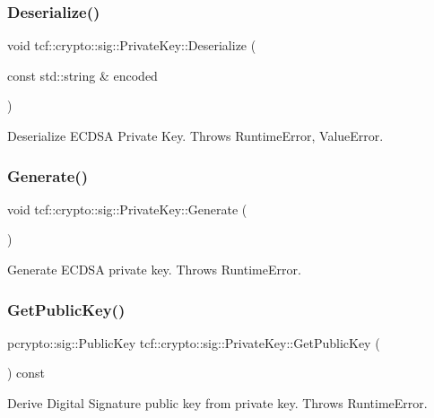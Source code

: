 \subsubsection{\texorpdfstring{Deserialize()}{Deserialize()}}
{\footnotesize\ttfamily void tcf\+::crypto\+::sig\+::\+Private\+Key\+::\+Deserialize (\begin{DoxyParamCaption}\item[{const std\+::string \&}]{encoded }\end{DoxyParamCaption})}

Deserialize E\+C\+D\+SA Private Key. Throws Runtime\+Error, Value\+Error. \mbox{\label{classtcf_1_1crypto_1_1sig_1_1PrivateKey_a869f91662055e93ea7cc5ed6d3c21423}} 
\subsubsection{\texorpdfstring{Generate()}{Generate()}}
{\footnotesize\ttfamily void tcf\+::crypto\+::sig\+::\+Private\+Key\+::\+Generate (\begin{DoxyParamCaption}{ }\end{DoxyParamCaption})}

Generate E\+C\+D\+SA private key. Throws Runtime\+Error. \mbox{\label{classtcf_1_1crypto_1_1sig_1_1PrivateKey_a410734270e37a888b335ea8d3901e981}} 
\subsubsection{\texorpdfstring{Get\+Public\+Key()}{GetPublicKey()}}
{\footnotesize\ttfamily pcrypto\+::sig\+::\+Public\+Key tcf\+::crypto\+::sig\+::\+Private\+Key\+::\+Get\+Public\+Key (\begin{DoxyParamCaption}{ }\end{DoxyParamCaption}) const}

Derive Digital Signature public key from private key. Throws Runtime\+Error. \mbox{\label{classtcf_1_1crypto_1_1sig_1_1PrivateKey_aaeca9d13bd64ab34188c363edcb53433}} 
